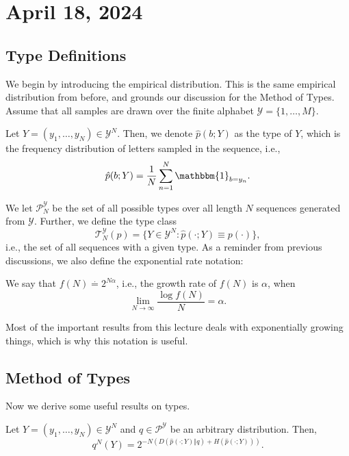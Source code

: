 \section{April 18, 2024}

\subsection{Type Definitions}

We begin by introducing the empirical distribution. This is the same empirical distribution from before, and grounds our discussion for the Method of Types. Assume that all samples are drawn over the finite alphabet $\mathcal{Y}=\{1,\hdots,M\}$. 
\begin{definition}

Let $Y=(y_1,\hdots,y_N)\in \mathcal{Y}^N$. Then, we denote $\hat{p}(b; Y)$ as the \ac{type} of $Y$, which is the frequency distribution of letters sampled in the sequence, i.e., 
\[\hat{p}(b; Y) = \frac{1}{N}\sum_{n=1}^N \mathbbm{1}_{b=y_n}.\] 
\end{definition}

We let $\mathcal{P}_N^{\mathcal{Y}}$ be the set of all possible types over all length $N$ sequences generated from $\mathcal{Y}$. Further, we define the \ac{type class}
\[\mathcal{T}_N^{\mathcal{Y}}(p) = \{Y\in \mathcal{Y}^N: \hat{p}(\cdot; Y) \equiv p(\cdot)\},\]
i.e., the set of all sequences with a given type. As a reminder from previous discussions, we also define the exponential rate notation: 
\begin{definition}

We say that $f(N)\overset{\cdot}{=} 2^{N\alpha}$, i.e., the growth rate of $f(N)$ is $\alpha$, when 
\[\lim_{N\rightarrow \infty}\frac{\log f(N)}{N} = \alpha.\] 
\end{definition}
\noindent Most of the important results from this lecture deals with exponentially growing things, which is why this notation is useful. 

\subsection{Method of Types}

Now we derive some useful results on types. 

\begin{theorem}
\lemlabel

Let $Y=(y_1,\hdots,y_N)\in \mathcal{Y}^N$ and $q\in \mathcal{P}^{\mathcal{Y}}$ be an arbitrary distribution. Then, 
\[q^N(Y) = 2^{-N(D(\hat{p}(\cdot; Y)\Vert q) + H(\hat{p}(\cdot; Y)))}.\] 
\end{theorem}


